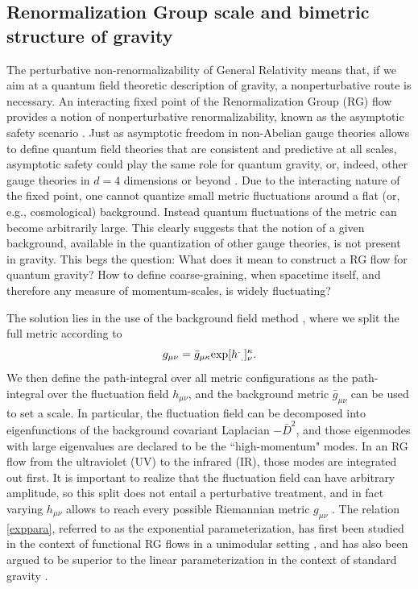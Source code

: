 \documentclass[11pt]{book} %
\newcommand{\be}{\begin{equation}}
\newcommand{\ee}{\end{equation}}
\begin{document}
\subsection{Renormalization Group scale and bimetric structure of gravity}
%
The perturbative non-renormalizability of General Relativity means that,
if we aim at a quantum field theoretic description of gravity, a nonperturbative route is necessary. An interacting fixed point of the Renormalization Group (RG) flow provides a notion of nonperturbative renormalizability, known as the asymptotic safety scenario \cite{Weinberg:1980gg}. Just as asymptotic freedom in non-Abelian gauge theories allows to define quantum field theories that are consistent and predictive at all scales, asymptotic safety could play the same role for quantum gravity, or, indeed, other gauge theories in $d=4$ dimensions \cite{Litim:2014uca, Litim:2015iea} or beyond \cite{Gies:2003ic}.
Due to the interacting nature of the fixed point, one cannot quantize small metric fluctuations around a flat (or, e.g., cosmological) background. Instead quantum fluctuations of the metric can become arbitrarily large. This clearly suggests that the notion of a given background, available in the quantization of other gauge theories, is not present in gravity. This begs the question: What does it mean to construct a RG flow for quantum gravity? How to define coarse-graining, when spacetime itself, and therefore any measure of momentum-scales, is widely fluctuating?


The solution lies in the use of the background field method \cite{Abbott:1980hw}, where we split the full metric according to
\be
g_{\mu \nu} = \bar{g}_{\mu \kappa} {\rm exp}[ h^{.}_{\,\,.}]^{\kappa}_{\nu}.\label{exppara}
\ee
We then define the path-integral over all metric configurations as the path-integral over the fluctuation field $h_{\mu \nu}$, and the background metric $\bar{g}_{\mu \nu}$ can be used to set a scale. In particular, the fluctuation field can be decomposed into eigenfunctions of the background covariant Laplacian $-\bar{D}^2$, and those eigenmodes with large eigenvalues are declared to be the ``high-momentum" modes. In an RG flow from the ultraviolet (UV) to the infrared (IR), those modes are integrated out first.
It is important to realize that the fluctuation field can have arbitrary amplitude, so this split does not entail a perturbative treatment, and in fact varying $h_{\mu \nu}$ allows to reach every possible Riemannian metric $g_{\mu \nu}$ \cite{Demmel:2015zfa}.
The relation \eqref{exppara}, referred to as the exponential parameterization, has first been studied in the context of functional RG flows in a unimodular setting \cite{Eichhorn:2013xr,Eichhorn:2015bna}, and has also been argued to be superior to the linear parameterization in the context of standard gravity \cite{Nink:2014yya,Percacci:2015wwa,Demmel:2015zfa, Labus:2015ska,Ohta:2015efa,Gies:2015tca}.
\end{document}
